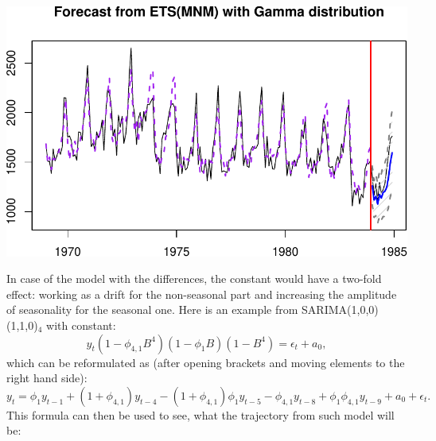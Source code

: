 \documentclass[
]{book}
\theoremstyle{definition}
\theoremstyle{definition}
\theoremstyle{definition}
\theoremstyle{definition}
\theoremstyle{remark}
\begin{document}
\includegraphics{adam_files/figure-latex/unnamed-chunk-56-1.pdf}

In case of the model with the differences, the constant would have a two-fold effect: working as a drift for the non-seasonal part and increasing the amplitude of seasonality for the seasonal one. Here is an example from SARIMA(1,0,0)(1,1,0)\(_4\) with constant:
\begin{equation}
  y_t (1 - \phi_{4,1} B^4)(1 - \phi_{1} B) (1 - B^4) = \epsilon_t + a_0 ,
  \label{eq:SARIMA101110Example01}
\end{equation}
which can be reformulated as (after opening brackets and moving elements to the right hand side):
\begin{equation}
  y_t = \phi_{1} y_{t-1} + (1+\phi_{4,1}) y_{t-4} - (1+\phi_{4,1}) \phi_{1} y_{t-5} - \phi_{4,1} y_{t-8} + \phi_1 \phi_{4,1} y_{t-9} + a_0 + \epsilon_t .
  \label{eq:SARIMA101110Example02}
\end{equation}
This formula can then be used to see, what the trajectory from such model will be:
\end{document}
